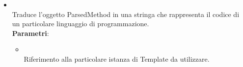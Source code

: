 \begin{itemize}
\begin{itemize}
\item {}
\\ Traduce l'oggetto ParsedMethod in una stringa che rappresenta il codice di un particolare linguaggio di programmazione.
\\ \textbf{Parametri}:
\begin{itemize}
\item {}
\\ Riferimento alla particolare istanza di Template da utilizzare.
\end{itemize}
\end{itemize}
\end{itemize}

\label{\nogloxy{swedesigner::server::project::ParsedProgram}}
\begin{figure}[h]
\centering
{}
\caption{}
\end{figure}
\FloatBarrier

